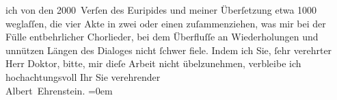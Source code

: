 \begin{ledgroupsized}[t]{13cm}
               ich von den 2000 Verſen des Euripides und
               meiner Überſetzung etwa 1000 weglaſſen, die vier Akte in zwei oder einen
               zuſammenziehen, was mir bei der Fülle entbehrlicher Chorlieder, bei dem Überfluſſe an
               Wiederholungen und unnützen Längen des Dialoges nicht ſchwer fiele. Indem ich Sie,
               ſehr verehrter Herr Doktor, bitte, mir dieſe Arbeit nicht übelzunehmen, verbleibe ich
               hochachtungsvoll\pend
           \pstart
           Ihr Sie verehrender{\\[\baselineskip]}\spacefill\mbox{Albert Ehrenstein.}\pend
           \leftskip=0em{}
         
         \endnumbering{}\end{ledgroupsized}  \newcommand{\dateiname}{L01640}\newcommand{\titel}{Albert Ehrenstein an Arthur Schnitzler, 30. 11. 1906}\newcommand{\editorInnen}{Martin Anton Müller und Gerd-Hermann Susen}
      
